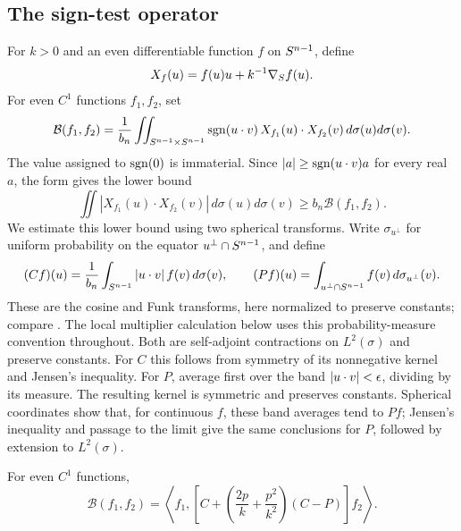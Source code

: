 \subsection{The sign-test operator}

For $k>0$ and an even differentiable function $f$ on $S^{n-1}$, define
\begin{equation}\label{eq:vector-field}
 X_f(u)=f(u)u+k^{-1}\nabla_S f(u).
\end{equation}
For even $C^1$ functions $f_1,f_2$, set
\begin{equation}\label{eq:sign-form}
 \mathcal B(f_1,f_2)
 =\frac1{b_n}\iint_{S^{n-1}\times S^{n-1}}
   \operatorname{sgn}(u\cdot v)\,X_{f_1}(u)\cdot X_{f_2}(v)
   \,d\sigma(u)d\sigma(v).
\end{equation}
The value assigned to $\operatorname{sgn}(0)$ is immaterial. Since
$|a|\ge\operatorname{sgn}(u\cdot v)a$ for every real $a$, the form gives the lower bound
\[
 \iint |X_{f_1}(u)\cdot X_{f_2}(v)|\,d\sigma(u)d\sigma(v)
 \ge b_n\mathcal B(f_1,f_2).
\]
We estimate this lower bound using two spherical transforms.
Write $\sigma_{u^\perp}$
for uniform probability on the equator $u^\perp\cap S^{n-1}$, and define
\[
 (Cf)(u)=\frac1{b_n}\int_{S^{n-1}}\left|u\cdot v\right|f(v)\,d\sigma(v),
 \qquad
 (Pf)(u)=\int_{u^\perp\cap S^{n-1}}f(v)\,d\sigma_{u^\perp}(v).
\]
These are the cosine and Funk transforms, here normalized to preserve
constants; compare \cite[Section~2, especially (2.3), (2.5)--(2.6)]
{OlafssonPasqualeRubin2013}. The local multiplier calculation below
uses this probability-measure convention throughout.
Both are self-adjoint contractions on $L^2(\sigma)$ and preserve
constants.  For $C$ this follows from symmetry of its nonnegative
kernel and Jensen's inequality.  For $P$, average first over the band
$\left|u\cdot v\right|<\epsilon$, dividing by its measure.  The resulting
kernel is symmetric and preserves constants.  Spherical coordinates
show that, for continuous $f$, these band averages tend to $Pf$;
Jensen's inequality and passage to the limit give the same conclusions
for $P$, followed by extension to $L^2(\sigma)$.

\begin{lemma}\label{lem:sign-operator}
For even $C^1$ functions,
\begin{equation}\label{eq:sign-operator}
 \mathcal B(f_1,f_2)
 =\left\langle f_1,
   \left[C+\left(\frac{2p}{k}+\frac{p^2}{k^2}\right)(C-P)\right]
   f_2\right\rangle.
\end{equation}
\end{lemma}

